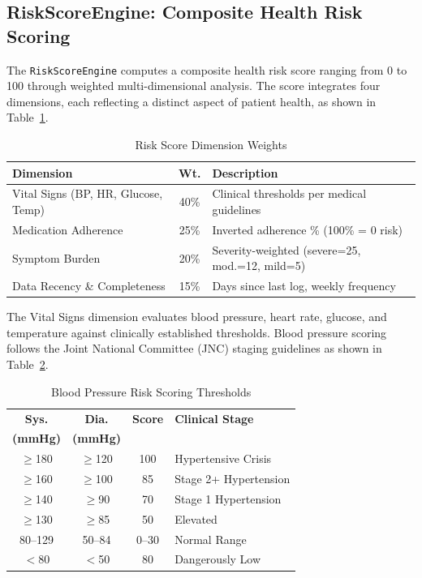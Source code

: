 \documentclass[journal,onecolumn,web]{ieeecolor}
\begin{document}
\subsection{RiskScoreEngine: Composite Health Risk
Scoring}
The {\tt RiskScoreEngine} computes a composite health
risk score ranging from 0 to 100 through weighted
multi-dimensional analysis. The score integrates four
dimensions, each reflecting a distinct aspect of
patient health, as shown in
Table~\ref{tab:riskweights}.

\begin{table}[!t]
\caption{Risk Score Dimension Weights}
\label{tab:riskweights}
\centering\small
\begin{tabular}{p{2.2cm} c p{3.2cm}}
\toprule
{\bf Dimension} & {\bf Wt.}
& {\bf Description} \\
\midrule
Vital Signs (BP, HR, Glucose, Temp) & 40\%
& Clinical thresholds per medical guidelines \\
Medication Adherence & 25\%
& Inverted adherence \% (100\% = 0 risk) \\
Symptom Burden & 20\%
& Severity-weighted (severe=25, mod.=12, mild=5) \\
Data Recency \& Completeness & 15\%
& Days since last log, weekly frequency \\
\bottomrule
\end{tabular}
\end{table}

The Vital Signs dimension evaluates blood pressure,
heart rate, glucose, and temperature against clinically
established thresholds. Blood pressure scoring follows
the Joint National Committee (JNC) staging guidelines
as shown in Table~\ref{tab:bpscoring}.

\begin{table}[!t]
\caption{Blood Pressure Risk Scoring Thresholds}
\label{tab:bpscoring}
\centering\small
\begin{tabular}{c c c l}
\toprule
{\bf Sys.} & {\bf Dia.} & {\bf Score}
& {\bf Clinical Stage} \\
{\bf (mmHg)} & {\bf (mmHg)} & & \\
\midrule
$\geq$180 & $\geq$120 & 100
& Hypertensive Crisis \\
$\geq$160 & $\geq$100 & 85
& Stage 2+ Hypertension \\
$\geq$140 & $\geq$90  & 70
& Stage 1 Hypertension \\
$\geq$130 & $\geq$85  & 50
& Elevated \\
80--129   & 50--84    & 0--30
& Normal Range \\
$<$80     & $<$50     & 80
& Dangerously Low \\
\bottomrule
\end{tabular}
\end{table}
\end{document}
